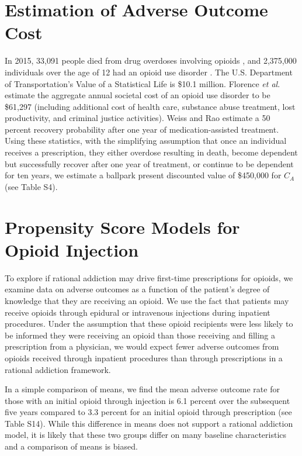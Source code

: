 \documentclass[9pt,twoside]{pnas-new}
\begin{document}
\section{Estimation of Adverse Outcome Cost}

In 2015, 33,091 people died from drug overdoses involving opioids \cite{nida1}, and 2,375,000 individuals over the age of 12 had an opioid use disorder \cite{cbhsq}. The U.S. Department of Transportation's Value of a Statistical Life is \$10.1 million. Florence \textit{et al}. \cite{florence} estimate the aggregate annual societal cost of an opioid use disorder to be \$61,297 (including additional cost of health care, substance abuse treatment, lost productivity, and criminal justice activities). Weiss and Rao \cite{weiss} estimate a 50 percent recovery probability after one year of medication-assisted treatment. Using these statistics, with the simplifying assumption that once an individual receives a prescription, they either overdose resulting in death, become dependent but successfully recover after one year of treatment, or continue to be dependent for ten years, we estimate a ballpark present discounted value of \$450,000 for $C_A$ (see Table S4).

\section{Propensity Score Models for Opioid Injection}

To explore if rational addiction may drive first-time prescriptions for opioids, we examine data on adverse outcomes as a function of the patient's degree of knowledge that they are receiving an opioid. We use the fact that patients may receive opioids through epidural or intravenous injections during inpatient procedures. Under the assumption that these opioid recipients were less likely to be informed they were receiving an opioid than those receiving and filling a prescription from a physician, we would expect fewer adverse outcomes from opioids received through inpatient procedures than through prescriptions in a rational addiction framework.

In a simple comparison of means, we find the mean adverse outcome rate for those with an initial opioid through injection is 6.1 percent over the subsequent five years compared to 3.3 percent for an initial opioid through prescription (see Table S14). While this difference in means does not support a rational addiction model, it is likely that these two groups differ on many baseline characteristics and a comparison of means is biased.
\end{document}
